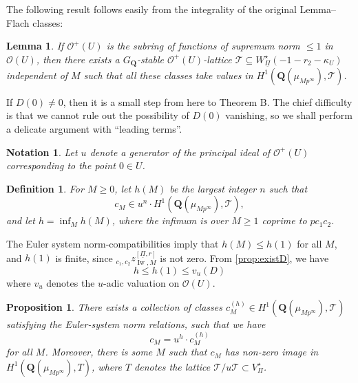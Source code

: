 \documentclass[cjm]{ipart}
\theoremstyle{plain}
\newtheorem{lemma}[theorem]{Lemma}
\newtheorem{proposition}[theorem]{Proposition}
\newtheorem{definition}[theorem]{Definition}
\newtheorem{notation}[theorem]{Notation}
\theoremstyle{remark}
\DeclareMathOperator{\Iw}{Iw}
\newcommand{\QQ}{\mathbf{Q}}
\newcommand{\cO}{\mathcal{O}}
\newcommand{\cT}{\mathcal{T}}
\newcommand{\uPi}{\underline{\Pi}}
\numberwithin{equation}{subsection}
\renewcommand{\le}{\leqslant}
\renewcommand{\ge}{\geqslant}
\begin{document}
  The following result follows easily from the integrality of the original Lemma--Flach classes:

  \begin{lemma}
   If $\cO^+(U)$ is the subring of functions of supremum norm $\le 1$ in $\cO(U)$, then there exists a $G_{\QQ}$-stable $\cO^+(U)$-lattice $\cT \subseteq W_{\uPi}^\star(-1-r_2-\kappa_U)$ independent of $M$ such that all these classes take values in $H^1(\QQ(\mu_{Mp^\infty}),\cT)$.
  \end{lemma}

  If $D(0) \ne 0$, then it is a small step from here to Theorem B. The chief difficulty is that we cannot rule out the possibility of $D(0)$ vanishing, so we shall perform a delicate argument with ``leading terms''.

  \begin{notation}
   Let $u$ denote a generator of the principal ideal of $\cO^+(U)$ corresponding to the point $0 \in U$.
  \end{notation}

  \begin{definition}
   For $M \ge 0$, let $h(M)$ be the largest integer $n$ such that
   \[  c_M \in u^n \cdot H^1(\QQ(\mu_{Mp^\infty}), \cT), \]
   and let $h = \inf_{M} h(M)$, where the infimum is over $M \ge 1$ coprime to $pc_1c_2$.
  \end{definition}

  The Euler system norm-compatibilities imply that $h(M) \le h(1)$ for all $M$, and $h(1)$ is finite, since ${}_{c_1, c_2} z^{[\uPi, r]}_{\Iw, M}$ is not zero. From \cref{prop:existD}, we have
  \[ h \le h(1) \le v_u\left(D\right) \]
  where $v_u$ denotes the $u$-adic valuation on $\cO(U)$.

  \begin{proposition}
   There exists a collection of classes $c_M^{(h)} \in H^1(\QQ(\mu_{Mp^\infty}), \cT)$ satisfying the Euler-system norm relations, such that we have
   \[ c_M = u^h \cdot c_M^{(h)} \]
   for all $M$. Moreover, there is some $M$ such that $c_M$ has non-zero image in $H^1(\QQ(\mu_{Mp^\infty}), T)$, where $T$ denotes the lattice $\cT/u\cT \subset V_{\Pi}^\star$.
  \end{proposition}
\end{document}
